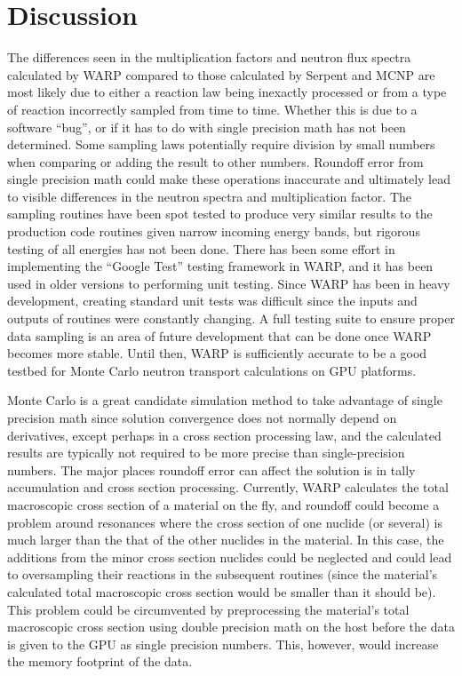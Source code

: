 \documentclass[preprint,12pt]{elsarticle}
\begin{document}

\section{Discussion}
\label{sec:disc}

The differences seen in the multiplication factors and neutron flux spectra calculated by WARP compared to those calculated by Serpent and MCNP are most likely due to either a reaction law being inexactly processed or from a type of reaction incorrectly sampled from time to time.  Whether this is due to a software ``bug'', or if it has to do with single precision math has not been determined.  Some sampling laws potentially require division by small numbers when comparing or adding the result to other numbers.  Roundoff error from single precision math could make these operations inaccurate and ultimately lead to visible differences in the neutron spectra and multiplication factor.  The sampling routines have been spot tested to produce very similar results to the production code routines given narrow incoming energy bands, but rigorous testing of all energies has not been done.  There has been some effort in implementing the ``Google Test'' testing framework \cite{gtest} in WARP, and it has been used in older versions to performing unit testing.  Since WARP has been in heavy development, creating standard unit tests was difficult since the inputs and outputs of routines were constantly changing.  A full testing suite to ensure proper data sampling is an area of future development that can be done once WARP becomes more stable.  Until then, WARP is sufficiently accurate to be a good testbed for Monte Carlo neutron transport calculations on GPU platforms. 

Monte Carlo is a great candidate simulation method to take advantage of single precision math since solution convergence does not normally depend on derivatives, except perhaps in a cross section processing law, and the calculated results are typically not required to be more precise than single-precision numbers.  The major places roundoff error can affect the solution is in tally accumulation and cross section processing.  Currently, WARP calculates the total macroscopic cross section of a material on the fly, and roundoff could become a problem around resonances where the cross section of one nuclide (or several) is much larger than the that of the other nuclides in the material.  In this case, the additions from the minor cross section nuclides could be neglected and could lead to oversampling their reactions in the subsequent routines (since the material's calculated total macroscopic cross section would be smaller than it should be).  This problem could be circumvented by preprocessing the material's total macroscopic cross section using double precision math on the host before the data is given to the GPU as single precision numbers.  This, however, would increase the memory footprint of the data.
\end{document}
